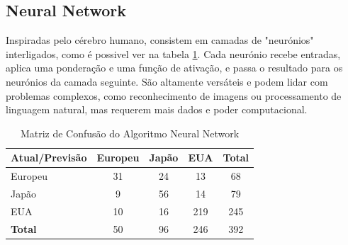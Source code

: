 \documentclass[conference]{IEEEtran}
\begin{document}
\subsection{Neural Network}
Inspiradas pelo cérebro humano, consistem em camadas de "neurónios" interligados, como é possivel ver na tabela \ref{tab:conf_matrix_neural}.
Cada neurónio recebe entradas, aplica uma ponderação e uma função de ativação, e passa o resultado para os neurónios da camada seguinte.
São altamente versáteis e podem lidar com problemas complexos, como reconhecimento de imagens ou processamento de linguagem natural,
mas requerem mais dados e poder computacional.
\begin{table}[!ht]
	\centering
	\begin{tabular}{lcccc}
		\toprule
		\textbf{Atual/Previsão} & \textbf{Europeu} & \textbf{Japão} & \textbf{EUA} & \textbf{Total} \\
		\midrule
		Europeu                 & 31               & 24             & 13           & 68             \\
		Japão                   & 9                & 56             & 14           & 79             \\
		EUA                     & 10               & 16             & 219          & 245            \\
		\midrule
		\textbf{Total}          & 50               & 96             & 246          & 392            \\
		\bottomrule
	\end{tabular}
	\caption{Matriz de Confusão do Algoritmo Neural Network}
	\label{tab:conf_matrix_neural}

\end{table}

\end{document}
